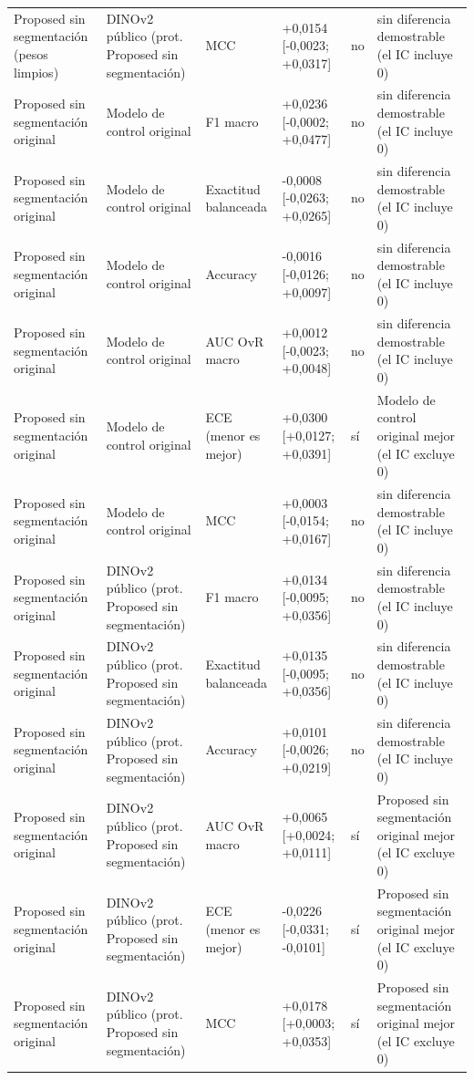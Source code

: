 \begin{longtable}{@{}llllll@{}}
Proposed sin segmentación (pesos limpios) & DINOv2 público (prot. Proposed sin segmentación) & MCC & +0,0154 [-0,0023; +0,0317] & no & sin diferencia demostrable (el IC incluye 0) \\
Proposed sin segmentación original & Modelo de control original & F1 macro & +0,0236 [-0,0002; +0,0477] & no & sin diferencia demostrable (el IC incluye 0) \\
Proposed sin segmentación original & Modelo de control original & Exactitud balanceada & -0,0008 [-0,0263; +0,0265] & no & sin diferencia demostrable (el IC incluye 0) \\
Proposed sin segmentación original & Modelo de control original & Accuracy & -0,0016 [-0,0126; +0,0097] & no & sin diferencia demostrable (el IC incluye 0) \\
Proposed sin segmentación original & Modelo de control original & AUC OvR macro & +0,0012 [-0,0023; +0,0048] & no & sin diferencia demostrable (el IC incluye 0) \\
Proposed sin segmentación original & Modelo de control original & ECE (menor es mejor) & +0,0300 [+0,0127; +0,0391] & sí & Modelo de control original mejor (el IC excluye 0) \\
Proposed sin segmentación original & Modelo de control original & MCC & +0,0003 [-0,0154; +0,0167] & no & sin diferencia demostrable (el IC incluye 0) \\
Proposed sin segmentación original & DINOv2 público (prot. Proposed sin segmentación) & F1 macro & +0,0134 [-0,0095; +0,0356] & no & sin diferencia demostrable (el IC incluye 0) \\
Proposed sin segmentación original & DINOv2 público (prot. Proposed sin segmentación) & Exactitud balanceada & +0,0135 [-0,0095; +0,0356] & no & sin diferencia demostrable (el IC incluye 0) \\
Proposed sin segmentación original & DINOv2 público (prot. Proposed sin segmentación) & Accuracy & +0,0101 [-0,0026; +0,0219] & no & sin diferencia demostrable (el IC incluye 0) \\
Proposed sin segmentación original & DINOv2 público (prot. Proposed sin segmentación) & AUC OvR macro & +0,0065 [+0,0024; +0,0111] & sí & Proposed sin segmentación original mejor (el IC excluye 0) \\
Proposed sin segmentación original & DINOv2 público (prot. Proposed sin segmentación) & ECE (menor es mejor) & -0,0226 [-0,0331; -0,0101] & sí & Proposed sin segmentación original mejor (el IC excluye 0) \\
Proposed sin segmentación original & DINOv2 público (prot. Proposed sin segmentación) & MCC & +0,0178 [+0,0003; +0,0353] & sí & Proposed sin segmentación original mejor (el IC excluye 0) \\
\bottomrule
\end{longtable}
\endgroup

